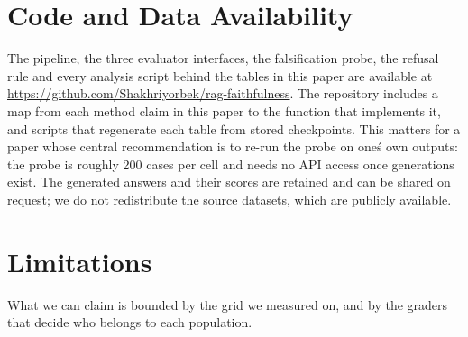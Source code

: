 \documentclass[11pt]{article}
\begin{document}
\section*{Code and Data Availability}

The pipeline, the three evaluator interfaces, the falsification probe, the refusal rule and every analysis script behind the tables in this paper are available at \url{https://github.com/Shakhriyorbek/rag-faithfulness}. The repository includes a map from each method claim in this paper to the function that implements it, and scripts that regenerate each table from stored checkpoints. This matters for a paper whose central recommendation is to re-run the probe on one\'s own outputs: the probe is roughly 200 cases per cell and needs no API access once generations exist. The generated answers and their scores are retained and can be shared on request; we do not redistribute the source datasets, which are publicly available.


\section*{Limitations}

What we can claim is bounded by the grid we measured on, and by the graders that decide who belongs to each population.
\end{document}

